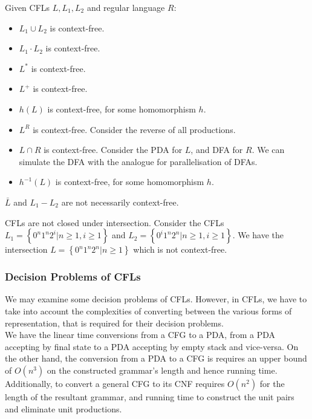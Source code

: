 Given CFLs $L,L_1,L_2$ and regular language $R$:
 \begin{itemize}
  \item $L_1\cup L_2$ is context-free.
  \item $L_1\cdot L_2$ is context-free.
  \item $L^{*}$ is context-free.
  \item $L^{+}$ is context-free.
  \item $h\left( L \right) $ is context-free, for some homomorphism $h$.
  \item $L^{R}$ is context-free. Consider the reverse of all productions.
  \item $L\cap R$ is context-free. Consider the PDA for $L$, and DFA for
    $R$. We can simulate the DFA with the analogue for parallelisation of
    DFAs.
  \item $h^{-1}\left( L \right) $ is context-free, for some homomorphism $h$.
\end{itemize}

\begin{remark}
  $\bar{L}$ and $L_1-L_2$ are not necessarily context-free.
\end{remark}

\begin{remark}
  CFLs are not closed under intersection. Consider the CFLs $L_1=\left\{
  0^{n}1^{n}2^{i}|n\ge 1,i\ge 1 \right\} $ and $L_2=\left\{
0^{i}1^{n}2^{n}|n\ge 1,i\ge 1 \right\} $. We have the intersection $L=\left\{
0^{n}1^{n}2^{n}|n\ge 1 \right\} $ which is not context-free.
\end{remark}

\subsubsection{Decision Problems of CFLs}
We may examine some decision problems of CFLs. However, in CFLs, we have to
take into account the complexities of converting between the various forms of
representation, that is required for their decision problems.\\

We have the linear time conversions from a CFG to a PDA, from a PDA accepting
by final state to a PDA accepting by empty stack and vice-versa. On the other hand, the
conversion from a PDA to a CFG is requires an upper bound of $O(n^{3})$ on the
constructed grammar's length and hence running time. Additionally, to convert a
general CFG to its CNF requires $O(n^{2})$ for the length of the resultant
grammar, and running time to construct the unit pairs and eliminate unit
productions.\\

